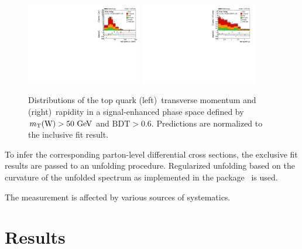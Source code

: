 \documentclass[12pt]{article}
\begin{document}
\begin{figure}[th]
\begin{center}
\includegraphics[width=0.45\textwidth]{figures/unfolding/reco_toppt_bdt.pdf}\hspace{0.05\textwidth}
\includegraphics[width=0.45\textwidth]{figures/unfolding/reco_topy_bdt.pdf}
\end{center}

\caption{\label{fig:recotop}Distributions of the top quark (left)~transverse momentum and (right)~rapidity in a signal-enhanced phase space defined by $m_{\mathrm{T}}(\mathrm{W})>50~\mathrm{GeV}$ and $\mathrm{BDT}>0.6$. Predictions are normalized to the inclusive fit result.}
\end{figure}

To infer the corresponding parton-level differential cross sections, the exclusive fit results are passed to an unfolding procedure. Regularized unfolding based on the curvature of the unfolded spectrum as implemented in the \tunfold package~\cite{tunfold} is used. 

The measurement is affected by various sources of systematics. 



\section{Results}
\end{document}
